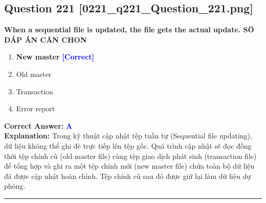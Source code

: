 \documentclass[11pt,a4paper]{article}
\begin{document}
\begin{minipage}{\textwidth}
\subsection*{Question 221 \quad \footnotesize{[0221\_q221\_Question\_221.png]}}
\noindent \textbf{When a sequential file is updated, the file gets the actual update. SÖ DÁP ÁN CÃN CHON}

\begin{enumerate}[label=\Alph*.]
    \item \textbf{New master} \hfill \textcolor{blue}{\textbf{[Correct]}}
    \item Old master
    \item Transaction
    \item Error report
\end{enumerate}

\noindent \textbf{Correct Answer:} \textcolor{blue}{\textbf{A}} \\[2pt]
\noindent \textbf{Explanation:} Trong kỹ thuật cập nhật tệp tuần tự (Sequential file updating), dữ liệu không thể ghi đè trực tiếp lên tệp gốc. Quá trình cập nhật sẽ đọc đồng thời tệp chính cũ (old master file) cùng tệp giao dịch phát sinh (transaction file) để tổng hợp và ghi ra một tệp chính mới (new master file) chứa toàn bộ dữ liệu đã được cập nhật hoàn chỉnh. Tệp chính cũ sau đó được giữ lại làm dữ liệu dự phòng.

\par\vspace{0.3cm}
\hrule
\vspace{0.3cm}
\end{minipage}
\end{document}
